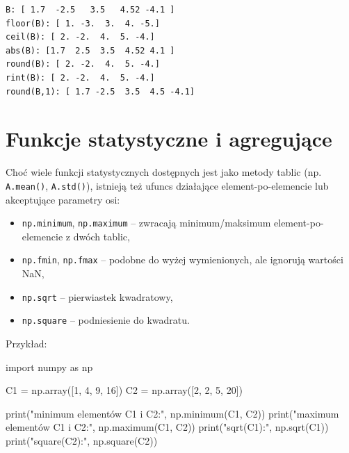 \documentclass[
  polish,
  letterpaper,
  DIV=11,
  numbers=noendperiod]{scrreprt}
\newenvironment{Shaded}{\begin{snugshade}}{\end{snugshade}}
\newcommand{\BuiltInTok}[1]{\textcolor[rgb]{0.00,0.23,0.31}{#1}}
\newcommand{\DecValTok}[1]{\textcolor[rgb]{0.68,0.00,0.00}{#1}}
\newcommand{\ImportTok}[1]{\textcolor[rgb]{0.00,0.46,0.62}{#1}}
\newcommand{\NormalTok}[1]{\textcolor[rgb]{0.00,0.23,0.31}{#1}}
\newcommand{\OperatorTok}[1]{\textcolor[rgb]{0.37,0.37,0.37}{#1}}
\newcommand{\StringTok}[1]{\textcolor[rgb]{0.13,0.47,0.30}{#1}}
\providecommand{\tightlist}{%
  \setlength{\itemsep}{0pt}\setlength{\parskip}{0pt}}
\begin{document}
\begin{verbatim}
B: [ 1.7  -2.5   3.5   4.52 -4.1 ]
floor(B): [ 1. -3.  3.  4. -5.]
ceil(B): [ 2. -2.  4.  5. -4.]
abs(B): [1.7  2.5  3.5  4.52 4.1 ]
round(B): [ 2. -2.  4.  5. -4.]
rint(B): [ 2. -2.  4.  5. -4.]
round(B,1): [ 1.7 -2.5  3.5  4.5 -4.1]
\end{verbatim}

\section{Funkcje statystyczne i
agregujące}\label{funkcje-statystyczne-i-agregujux105ce}

Choć wiele funkcji statystycznych dostępnych jest jako metody tablic
(np. \texttt{A.mean()}, \texttt{A.std()}), istnieją też ufuncs
działające element-po-elemencie lub akceptujące parametry osi:

\begin{itemize}
\tightlist
\item
  \texttt{np.minimum}, \texttt{np.maximum} -- zwracają minimum/maksimum
  element-po-elemencie z dwóch tablic,
\item
  \texttt{np.fmin}, \texttt{np.fmax} -- podobne do wyżej wymienionych,
  ale ignorują wartości NaN,
\item
  \texttt{np.sqrt} -- pierwiastek kwadratowy,
\item
  \texttt{np.square} -- podniesienie do kwadratu.
\end{itemize}

Przykład:

\begin{Shaded}
\begin{Highlighting}[]
\ImportTok{import}\NormalTok{ numpy }\ImportTok{as}\NormalTok{ np}

\NormalTok{C1 }\OperatorTok{=}\NormalTok{ np.array([}\DecValTok{1}\NormalTok{, }\DecValTok{4}\NormalTok{, }\DecValTok{9}\NormalTok{, }\DecValTok{16}\NormalTok{])}
\NormalTok{C2 }\OperatorTok{=}\NormalTok{ np.array([}\DecValTok{2}\NormalTok{, }\DecValTok{2}\NormalTok{, }\DecValTok{5}\NormalTok{, }\DecValTok{20}\NormalTok{])}

\BuiltInTok{print}\NormalTok{(}\StringTok{"minimum elementów C1 i C2:"}\NormalTok{, np.minimum(C1, C2))}
\BuiltInTok{print}\NormalTok{(}\StringTok{"maximum elementów C1 i C2:"}\NormalTok{, np.maximum(C1, C2))}
\BuiltInTok{print}\NormalTok{(}\StringTok{"sqrt(C1):"}\NormalTok{, np.sqrt(C1))}
\BuiltInTok{print}\NormalTok{(}\StringTok{"square(C2):"}\NormalTok{, np.square(C2))}
\end{Highlighting}
\end{Shaded}
\end{document}
